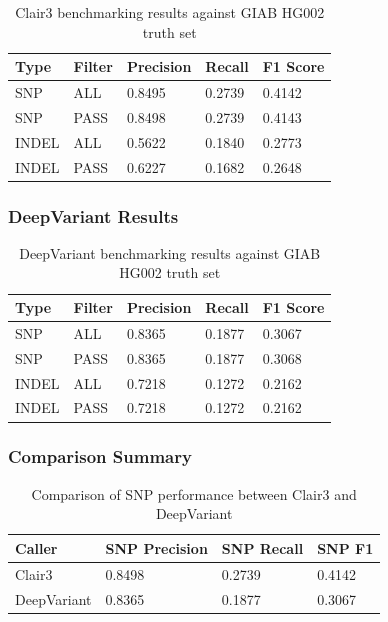 \documentclass[12pt,a4paper]{article}
\begin{document}
\begin{table}[h]
\centering
\begin{tabular}{@{}lllll@{}}
\toprule
\textbf{Type} & \textbf{Filter} & \textbf{Precision} & \textbf{Recall} & \textbf{F1 Score} \\
\midrule
SNP   & ALL  & 0.8495 & 0.2739 & 0.4142 \\
SNP   & PASS & 0.8498 & 0.2739 & 0.4143 \\
INDEL & ALL  & 0.5622 & 0.1840 & 0.2773 \\
INDEL & PASS & 0.6227 & 0.1682 & 0.2648 \\
\bottomrule
\end{tabular}
\caption{Clair3 benchmarking results against GIAB HG002 truth set}
\end{table}

\subsubsection{DeepVariant Results}

\begin{table}[h]
\centering
\begin{tabular}{@{}lllll@{}}
\toprule
\textbf{Type} & \textbf{Filter} & \textbf{Precision} & \textbf{Recall} & \textbf{F1 Score} \\
\midrule
SNP   & ALL  & 0.8365 & 0.1877 & 0.3067 \\
SNP   & PASS & 0.8365 & 0.1877 & 0.3068 \\
INDEL & ALL  & 0.7218 & 0.1272 & 0.2162 \\
INDEL & PASS & 0.7218 & 0.1272 & 0.2162 \\
\bottomrule
\end{tabular}
\caption{DeepVariant benchmarking results against GIAB HG002 truth set}
\end{table}

\subsubsection{Comparison Summary}

\begin{table}[h]
\centering
\begin{tabular}{@{}llll@{}}
\toprule
\textbf{Caller} & \textbf{SNP Precision} & \textbf{SNP Recall} & \textbf{SNP F1} \\
\midrule
Clair3      & 0.8498 & 0.2739 & 0.4142 \\
DeepVariant & 0.8365 & 0.1877 & 0.3067 \\
\bottomrule
\end{tabular}
\caption{Comparison of SNP performance between Clair3 and DeepVariant}
\end{table}
\end{document}
